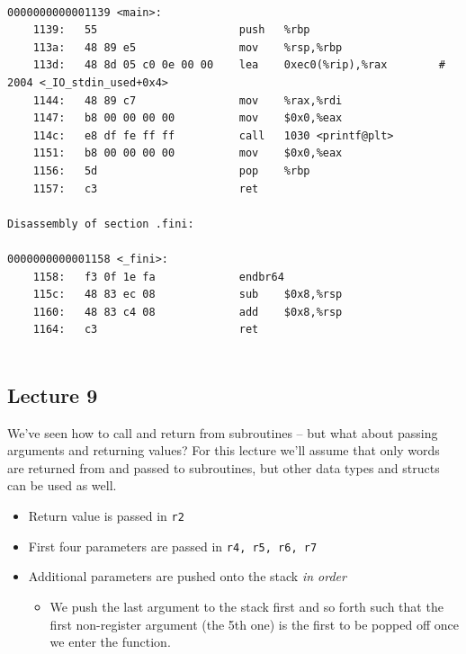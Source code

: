\documentclass[../notes.tex]{subfiles}
\begin{document}
\begin{listing}[H]
\begin{verbatim}

0000000000001139 <main>:
    1139:	55                   	push   %rbp
    113a:	48 89 e5             	mov    %rsp,%rbp
    113d:	48 8d 05 c0 0e 00 00 	lea    0xec0(%rip),%rax        # 2004 <_IO_stdin_used+0x4>
    1144:	48 89 c7             	mov    %rax,%rdi
    1147:	b8 00 00 00 00       	mov    $0x0,%eax
    114c:	e8 df fe ff ff       	call   1030 <printf@plt>
    1151:	b8 00 00 00 00       	mov    $0x0,%eax
    1156:	5d                   	pop    %rbp
    1157:	c3                   	ret

Disassembly of section .fini:

0000000000001158 <_fini>:
    1158:	f3 0f 1e fa          	endbr64
    115c:	48 83 ec 08          	sub    $0x8,%rsp
    1160:	48 83 c4 08          	add    $0x8,%rsp
    1164:	c3                   	ret


\end{verbatim}
\end{listing}

























\subsection{Lecture 9}

We've seen how to call and return from subroutines -- but what about passing arguments and returning values?
For this lecture we'll assume that only words are returned from and passed to subroutines, but other data types and structs can be used as well.


\begin{itemize}
	\item Return value is passed in \texttt{r2}
	\item First four parameters are passed in \texttt{r4, r5, r6, r7} 
	\item Additional parameters are pushed onto the stack \textit{in order} 
		\begin{itemize}
			\item We push the last argument to the stack first and so forth such that the first non-register argument (the 5th one) is the first to be popped off once we enter the function.
		\end{itemize}
\end{itemize}
\end{document}
